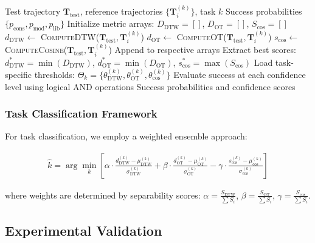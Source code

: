 \documentclass[10pt,twocolumn]{article}
\begin{document}
\begin{algorithm}[H]
\caption{Multi-Metric Trajectory Evaluation}
\label{alg:evaluation}
\begin{algorithmic}[1]
\REQUIRE Test trajectory $\mathbf{T}_{\text{test}}$, reference trajectories $\{\mathbf{T}_i^{(k)}\}$, task $k$
\ENSURE Success probabilities $\{p_{\text{cons}}, p_{\text{mod}}, p_{\text{lib}}\}$
\STATE Initialize metric arrays: $D_{\text{DTW}} = []$, $D_{\text{OT}} = []$, $S_{\text{cos}} = []$
    \STATE $d_{\text{DTW}} \leftarrow$ \textsc{ComputeDTW}($\mathbf{T}_{\text{test}}, \mathbf{T}_i^{(k)}$)
    \STATE $d_{\text{OT}} \leftarrow$ \textsc{ComputeOT}($\mathbf{T}_{\text{test}}, \mathbf{T}_i^{(k)}$)
    \STATE $s_{\text{cos}} \leftarrow$ \textsc{ComputeCosine}($\mathbf{T}_{\text{test}}, \mathbf{T}_i^{(k)}$)
    \STATE Append to respective arrays
\ENDFOR
\STATE Extract best scores: $d_{\text{DTW}}^* = \min(D_{\text{DTW}})$, $d_{\text{OT}}^* = \min(D_{\text{OT}})$, $s_{\text{cos}}^* = \max(S_{\text{cos}})$
\STATE Load task-specific thresholds: $\Theta_k = \{\theta_{\text{DTW}}^{(k)}, \theta_{\text{OT}}^{(k)}, \theta_{\text{cos}}^{(k)}\}$
\STATE Evaluate success at each confidence level using logical AND operations
\RETURN Success probabilities and confidence scores
\end{algorithmic}
\end{algorithm}

\subsubsection{Task Classification Framework}

For task classification, we employ a weighted ensemble approach:

\begin{align}
\hat{k} = \arg\min_k \left[ \alpha \cdot \frac{d_{\text{DTW}}^{(k)} - \mu_{\text{DTW}}^{(k)}}{\sigma_{\text{DTW}}^{(k)}} + \beta \cdot \frac{d_{\text{OT}}^{(k)} - \mu_{\text{OT}}^{(k)}}{\sigma_{\text{OT}}^{(k)}} - \gamma \cdot \frac{s_{\text{cos}}^{(k)} - \mu_{\text{cos}}^{(k)}}{\sigma_{\text{cos}}^{(k)}} \right]
\end{align}

where weights are determined by separability scores: $\alpha = \frac{S_{\text{DTW}}}{\sum S_i}$, $\beta = \frac{S_{\text{OT}}}{\sum S_i}$, $\gamma = \frac{S_{\text{cos}}}{\sum S_i}$.

\subsection{Experimental Validation}
\end{document}
